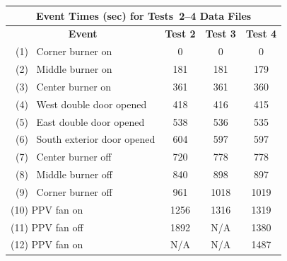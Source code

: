 \begin{figure}[!ht]
\renewcommand{\baselinestretch}{1}
\begin{minipage}[b]{1.01\columnwidth}
\begin{center}
	\begin{tabular}{lccc}
	\multicolumn{4}{c}{\normalsize Event Times (sec) for Tests~2--4 Data Files} \\
	\toprule
	\multicolumn{1}{c}{\textbf{Event}} 	& \textbf{Test 2} & \textbf{Test 3} & \textbf{Test 4} \\
	\midrule
	~(1)~ Corner burner on 				& 	0		  	  &	 	0			&		0		  \\
	~(2)~ Middle burner on 				&   181			  &		181			&		179		  \\
	~(3)~ Center burner on 				&   361			  &	   	361			&	   	360		  \\
	~(4)~ West double door opened 		&   418			  &    	416			&	   	415		  \\
	~(5)~ East double door opened 		&   538			  &    	536			&	   	535		  \\
	~(6)~ South exterior door opened 	&   604			  &    	597			&	   	597		  \\
	~(7)~ Center burner off				&   720			  &    	778			&	   	778		  \\
	~(8)~ Middle burner off				&   840			  &    	898			&	   	897		  \\
	~(9)~ Corner burner off				&   961			  &    	1018		&	   	1019	  \\
	(10) PPV fan on 					& 	1256		  &    	1316		&  	   	1319	  \\
	(11) PPV fan off 					& 	1892 		  & 	N/A 		& 		1380	  \\
	(12) PPV fan on 					& 	N/A 		  & 	N/A 		& 		1487 	  \\
	\bottomrule
	\end{tabular}

\end{center}
\end{minipage}
\end{figure}
